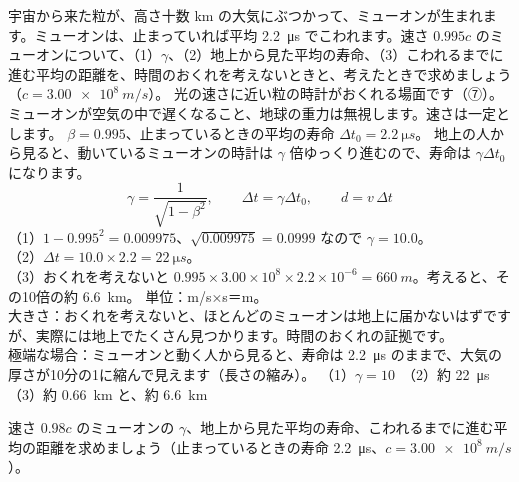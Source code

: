 \label{ph:原-11:ex5}
\begin{phreidai}[地上に届くミューオン]
宇宙から来た粒が、高さ十数 km の大気にぶつかって、ミューオンが生まれます。ミューオンは、止まっていれば平均 \qty{2.2}{\micro s} でこわれます。速さ $0.995c$ のミューオンについて、（1）$\gamma$、（2）地上から見た平均の寿命、（3）こわれるまでに進む平均の距離を、時間のおくれを考えないときと、考えたときで求めましょう（$c=\qty{3.00e8}{m/s}$）。
\phbamen
光の速さに近い粒の時計がおくれる場面です（⑦）。
\phmushi
ミューオンが空気の中で遅くなること、地球の重力は無視します。速さは一定とします。
\phzu
$\beta=0.995$、止まっているときの平均の寿命 $\Delta t_0=\qty{2.2}{\micro s}$。
\phriyu
地上の人から見ると、動いているミューオンの時計は $\gamma$ 倍ゆっくり進むので、寿命は $\gamma\Delta t_0$ になります。
\phtateru
\[ \gamma=\frac{1}{\sqrt{1-\beta^2}},\qquad\Delta t=\gamma\Delta t_0,\qquad d=v\,\Delta t \]
\phtoku
（1）$1-0.995^2=0.009975$、$\sqrt{0.009975}=0.0999$ なので $\gamma=10.0$。\\
（2）$\Delta t=10.0\times2.2=\qty{22}{\micro s}$。\\
（3）おくれを考えないと $0.995\times3.00\times10^8\times2.2\times10^{-6}=\qty{660}{m}$。考えると、その10倍の約 \qty{6.6}{km}。
\phtashikame
単位：m/s×s＝m。\\
大きさ：おくれを考えないと、ほとんどのミューオンは地上に届かないはずですが、実際には地上でたくさん見つかります。時間のおくれの証拠です。\\
極端な場合：ミューオンと動く人から見ると、寿命は \qty{2.2}{\micro s} のままで、大気の厚さが10分の1に縮んで見えます（長さの縮み）。
\kotae （1）$\gamma=10$　（2）約 \qty{22}{\micro s}　（3）約 \qty{0.66}{km} と、約 \qty{6.6}{km}
\end{phreidai}
\begin{jibun}
速さ $0.98c$ のミューオンの $\gamma$、地上から見た平均の寿命、こわれるまでに進む平均の距離を求めましょう（止まっているときの寿命 \qty{2.2}{\micro s}、$c=\qty{3.00e8}{m/s}$）。
\end{jibun}

